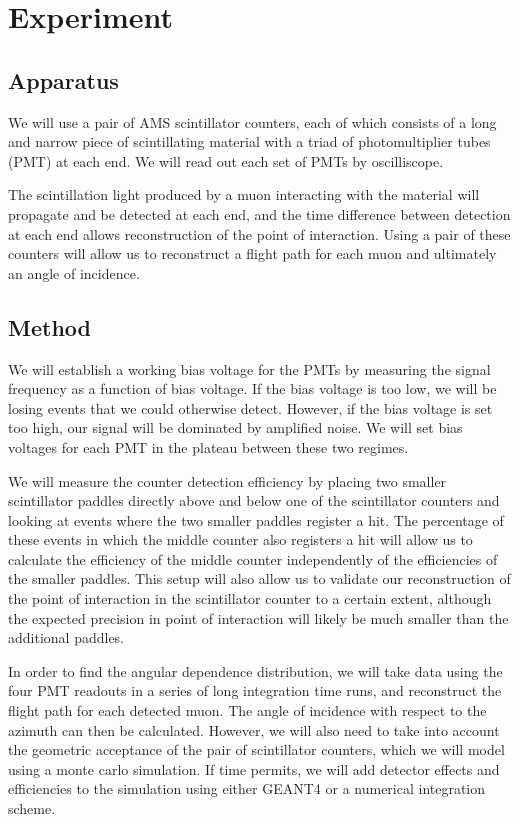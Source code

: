 \section{Experiment}

\subsection{Apparatus}

We will use a pair of AMS scintillator counters, each of which consists of a long and narrow piece of scintillating material with a triad of photomultiplier tubes (PMT) at each end. We will read out each set of PMTs by oscilliscope.

The scintillation light produced by a muon interacting with the material will propagate and be detected at each end, and the time difference between detection at each end allows reconstruction of the point of interaction. Using a pair of these counters will allow us to reconstruct a flight path for each muon and ultimately an angle of incidence.

\subsection{Method}

We will establish a working bias voltage for the PMTs by measuring the signal frequency as a function of bias voltage. If the bias voltage is too low, we will be losing events that we could otherwise detect. However, if the bias voltage is set too high, our signal will be dominated by amplified noise. We will set bias voltages for each PMT in the plateau between these two regimes.

We will measure the counter detection efficiency by placing two smaller scintillator paddles directly above and below one of the scintillator counters and looking at events where the two smaller paddles register a hit. The percentage of these events in which the middle counter also registers a hit will allow us to calculate the efficiency of the middle counter independently of the efficiencies of the smaller paddles. This setup will also allow us to validate our reconstruction of the point of interaction in the scintillator counter to a certain extent, although the expected precision in point of interaction will likely be much smaller than the additional paddles.

In order to find the angular dependence distribution, we will take data using the four PMT readouts in a series of long integration time runs, and reconstruct the flight path for each detected muon. The angle of incidence with respect to the azimuth can then be calculated. However, we will also need to take into account the geometric acceptance of the pair of scintillator counters, which we will model using a monte carlo simulation. If time permits, we will add detector effects and efficiencies to the simulation using either GEANT4 or a numerical integration scheme.


